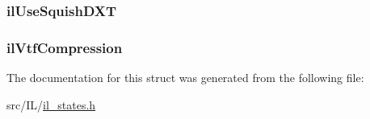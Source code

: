 \hypertarget{struct_i_l___s_t_a_t_e_s_ad670f9a6dceaa3d60eac91f4371b9f35}{
\subsubsection[{il\-Use\-Squish\-D\-X\-T}]{ il\-Use\-Squish\-D\-X\-T}}\label{struct_i_l___s_t_a_t_e_s_ad670f9a6dceaa3d60eac91f4371b9f35}
\hypertarget{struct_i_l___s_t_a_t_e_s_a533251f3f12fb59a255c2d1150fa8c63}{
\subsubsection[{il\-Vtf\-Compression}]{ il\-Vtf\-Compression}}\label{struct_i_l___s_t_a_t_e_s_a533251f3f12fb59a255c2d1150fa8c63}


The documentation for this struct was generated from the following file\-:\begin{DoxyCompactItemize}
\item 
src/\-I\-L/\hyperlink{il__states_8h}{il\-\_\-states.\-h}\end{DoxyCompactItemize}
